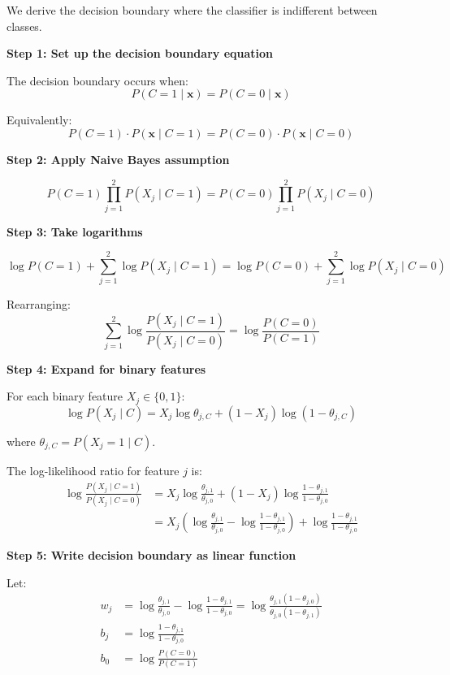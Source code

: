 \documentclass[12pt]{article}
\begin{document}
\begin{solution}
We derive the decision boundary where the classifier is indifferent between classes.

\textbf{Step 1: Set up the decision boundary equation}

The decision boundary occurs when:
\[
P(C = 1 \mid \mathbf{x}) = P(C = 0 \mid \mathbf{x})
\]

Equivalently:
\[
P(C = 1) \cdot P(\mathbf{x} \mid C = 1) = P(C = 0) \cdot P(\mathbf{x} \mid C = 0)
\]

\textbf{Step 2: Apply Naive Bayes assumption}

\[
P(C = 1) \prod_{j=1}^{2} P(X_j \mid C = 1) = P(C = 0) \prod_{j=1}^{2} P(X_j \mid C = 0)
\]

\textbf{Step 3: Take logarithms}

\[
\log P(C = 1) + \sum_{j=1}^{2} \log P(X_j \mid C = 1) = \log P(C = 0) + \sum_{j=1}^{2} \log P(X_j \mid C = 0)
\]

Rearranging:
\[
\sum_{j=1}^{2} \log \frac{P(X_j \mid C = 1)}{P(X_j \mid C = 0)} = \log \frac{P(C = 0)}{P(C = 1)}
\]

\textbf{Step 4: Expand for binary features}

For each binary feature $X_j \in \{0, 1\}$:
\[
\log P(X_j \mid C) = X_j \log \theta_{j,C} + (1 - X_j) \log(1 - \theta_{j,C})
\]

where $\theta_{j,C} = P(X_j = 1 \mid C)$.

The log-likelihood ratio for feature $j$ is:
\begin{align}
\log \frac{P(X_j \mid C = 1)}{P(X_j \mid C = 0)} &= X_j \log \frac{\theta_{j,1}}{\theta_{j,0}} + (1-X_j) \log \frac{1-\theta_{j,1}}{1-\theta_{j,0}} \\
&= X_j \left(\log \frac{\theta_{j,1}}{\theta_{j,0}} - \log \frac{1-\theta_{j,1}}{1-\theta_{j,0}}\right) + \log \frac{1-\theta_{j,1}}{1-\theta_{j,0}}
\end{align}

\textbf{Step 5: Write decision boundary as linear function}

Let:
\begin{align}
w_j &= \log \frac{\theta_{j,1}}{\theta_{j,0}} - \log \frac{1-\theta_{j,1}}{1-\theta_{j,0}} = \log \frac{\theta_{j,1}(1-\theta_{j,0})}{\theta_{j,0}(1-\theta_{j,1})} \\
b_j &= \log \frac{1-\theta_{j,1}}{1-\theta_{j,0}} \\
b_0 &= \log \frac{P(C = 0)}{P(C = 1)}
\end{align}


\end{solution}
\end{document}
